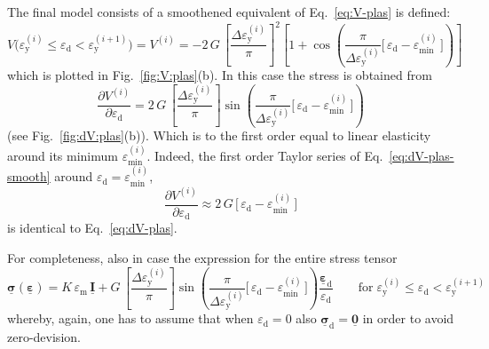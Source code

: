 \documentclass[times,namecite]{goose-article}
\newcommand\T[1]{\underline{\bm{{#1}}}}
\begin{document}
The final model consists of a smoothened equivalent of Eq.~\eqref{eq:V-plas} is defined:
\begin{equation}\label{eq:V-plas-smooth}
  V \big(
    \varepsilon_\mathrm{y}^{(i)} \leq \varepsilon_\mathrm{d} < \varepsilon_\mathrm{y}^{(i+1)}
  \big)
  =
  V^{(i)}
  =
  - 2 \, G \,
  \left[ \frac{\Delta \varepsilon_\mathrm{y}^{(i)}}{\pi} \right]^2
  \left[
    1
    +
    \cos \left(
      \frac{ \pi }{ \Delta \varepsilon_\mathrm{y}^{(i)} }
      \Big[\, \varepsilon_\mathrm{d} - \varepsilon_\mathrm{min}^{(i)} \,\Big]
    \right)
  \right]
\end{equation}
which is plotted in Fig.~\ref{fig:V:plas}(b). In this case the stress is obtained from
\begin{equation}\label{eq:dV-plas-smooth}
  \frac{\partial V^{(i)}}{\partial \varepsilon_\mathrm{d}}
  =
  2 \, G \,
  \left[ \frac{\Delta \varepsilon_\mathrm{y}^{(i)}}{\pi} \right]
  \sin \left(
    \frac{ \pi }{ \Delta \varepsilon_\mathrm{y}^{(i)} }
    \Big[\, \varepsilon_\mathrm{d} - \varepsilon_\mathrm{min}^{(i)} \,\Big]
  \right)
\end{equation}
(see Fig.~\ref{fig:dV:plas}(b)). Which is to the first order equal to linear elasticity around its minimum $\varepsilon_\mathrm{min}^{(i)}$. Indeed, the first order Taylor series of Eq.~\eqref{eq:dV-plas-smooth} around $\varepsilon_\mathrm{d} = \varepsilon_\mathrm{min}^{(i)}$,
\begin{equation}
  \frac{\partial V^{(i)}}{\partial \varepsilon_\mathrm{d}}
  \approx
  2 \, G \, \Big[\, \varepsilon_\mathrm{d} - \varepsilon_\mathrm{min}^{(i)} \,\Big]
\end{equation}
is identical to Eq.~\eqref{eq:dV-plas}.

For completeness, also in case the expression for the entire stress tensor
\begin{equation}
  \T{\sigma} ( \T{\varepsilon} )
  =
  K \, \varepsilon_\mathrm{m} \, \T{I}
  +
  G \,
  \left[ \frac{\Delta \varepsilon_\mathrm{y}^{(i)}}{\pi} \right]
  \sin \left(
    \frac{ \pi }{ \Delta \varepsilon_\mathrm{y}^{(i)} }
    \Big[\, \varepsilon_\mathrm{d} - \varepsilon_\mathrm{min}^{(i)} \,\Big]
  \right)
  \frac{\T{\varepsilon}_\mathrm{d}}{\varepsilon_\mathrm{d}}
  \qquad
  \mathrm{for}
  \;
  \varepsilon_\mathrm{y}^{(i)} \leq \varepsilon_\mathrm{d} < \varepsilon_\mathrm{y}^{(i+1)}
\end{equation}
whereby, again, one has to assume that when $\varepsilon_\mathrm{d} = 0$ also $\T{\sigma}_\mathrm{d} = \T{0}$ in order to avoid zero-devision.
\end{document}
